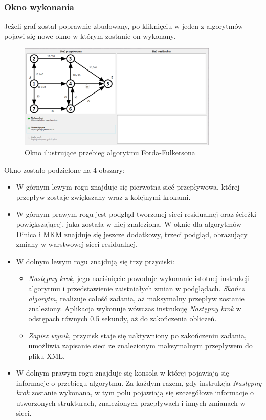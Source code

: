 \subsubsection{Okno wykonania}
Jeżeli graf został poprawnie zbudowany, po kliknięciu w jeden z algorytmów pojawi się nowe okno w którym zostanie on wykonany.
\begin{figure}[H]
	\centering
	\includegraphics[width=0.85\textwidth]{./img/spec_zew06_1}
	\caption{Okno ilustrujące przebieg algorytmu Forda-Fulkersona}
	\label{fig:algorithmWindowStart}
\end{figure}
Okno zostało podzielone na 4 obszary:
\begin{itemize}
	\item W górnym lewym rogu znajduje się pierwotna sieć przepływowa, której przepływ zostaje zwiększany wraz z kolejnymi krokami.
	\item W górnym prawym rogu jest podgląd tworzonej sieci residualnej oraz ścieżki powiększającej, jaka została w niej znaleziona. W oknie dla algorytmów Dinica i MKM znajduje się jeszcze dodatkowy, trzeci podgląd, obrazujący zmiany w warstwowej sieci residualnej.
	\item W dolnym lewym rogu znajdują się trzy przyciski:
	\begin{itemize}
		\item \textit{Następny krok}, jego naciśnięcie powoduje wykonanie istotnej instrukcji algorytmu i przedstawienie zaistniałych zmian w podglądach.
		\textit{Skończ algorytm}, realizuje całość zadania, aż maksymalny przepływ zostanie znaleziony. Aplikacja wykonuje wówczas instrukcję \textit{Następny krok} w odstępach równych 0.5 sekundy, aż do zakończenia obliczeń.
		\item \textit{Zapisz wynik}, przycisk staje się uaktywniony po zakończeniu zadania, umożliwia zapisanie sieci ze znalezionym maksymalnym przepływem do pliku XML.
	\end{itemize}
	\item W dolnym prawym rogu znajduje się konsola w której pojawiają się informacje o przebiegu algorytmu. Za każdym razem, gdy instrukcja \textit{Następny krok} zostanie wykonana, w tym polu pojawiają się szczegółowe informacje o utworzonych strukturach, znalezionych przepływach i innych zmianach w sieci.
\end{itemize}
